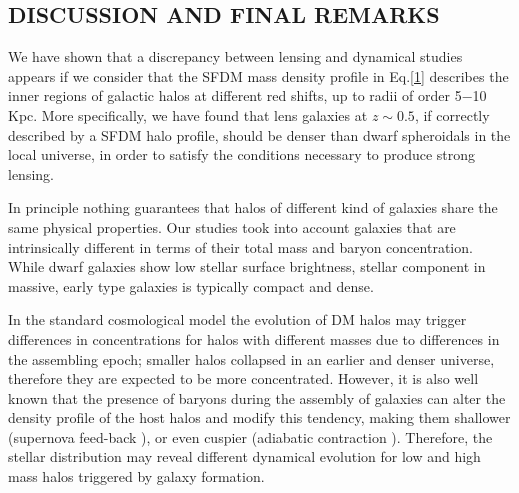 \documentclass[15pt]{IEEEtran}
\begin{document}
\begin{multicols}{2}
    \section{\textbf{DISCUSSION AND FINAL REMARKS}}
    We have shown that a discrepancy between lensing and dynamical studies appears if we consider that the SFDM mass density profile in Eq.\eqref{1} describes the inner regions of galactic halos at different red shifts, up to radii of order 5−10 Kpc.   More  specifically,  we  have  found  that  lens galaxies at \(z\sim 0.5\), if correctly described by a SFDM halo profile,  should  be  denser  than  dwarf  spheroidals  in  the local universe, in order to satisfy the conditions necessary to produce strong lensing.
    \par
    In  principle  nothing  guarantees  that  halos  of  different kind of galaxies share the same physical properties. Our  studies  took  into  account  galaxies  that  are  intrinsically different in terms of their total mass and baryon concentration.  While dwarf galaxies show low stellar surface brightness, stellar component in massive, early type galaxies is typically compact and dense.
    \par
    In  the  standard  cosmological  model  the  evolution  of DM  halos  may  trigger  differences  in  concentrations  for halos with different masses due to differences in the assembling epoch; smaller halos collapsed in an earlier and denser universe, therefore they are expected to be more concentrated.  However,  it  is  also  well  known  that  the presence of baryons during the assembly of galaxies can alter  the  density  profile  of  the  host  halos  and  modify this  tendency,  making  them  shallower  (supernova  feed-back ),  or  even  cuspier  (adiabatic  contraction ). Therefore,  the  stellar  distribution  may  reveal  different dynamical  evolution  for  low  and  high  mass  halos  triggered by galaxy formation.
    \par

\end{multicols}
\end{document}
